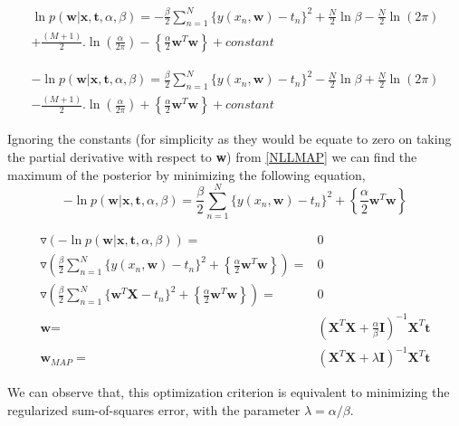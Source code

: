 \documentclass[12pt,twoside,a4paper]{article}
\begin{document}
\begin{multline}
        \ln p(\textbf{w}|\textbf{x},\textbf{t},\alpha,\beta) = -\frac{\beta}{2}\sum_{n=1}^{N} {\{y(x_n,\textbf{w})-t_n\}^2} + \frac{N}{2}\ln\beta - \frac{N}{2}\ln(2\pi) \\ + \frac{(M+1)}{2}.\ln\left( \frac{\alpha}{2\pi}\right) - \left\{ \frac{\alpha}{2}\textbf{w}^T\textbf{w}\right\} + constant
\end{multline}

\begin{multline} \label{NLLMAP}
       - \ln p(\textbf{w}|\textbf{x},\textbf{t},\alpha,\beta) = \frac{\beta}{2}\sum_{n=1}^{N} {\{y(x_n,\textbf{w})-t_n\}^2} - \frac{N}{2}\ln\beta + \frac{N}{2}\ln(2\pi) \\ - \frac{(M+1)}{2}.\ln\left( \frac{\alpha}{2\pi}\right) + \left\{ \frac{\alpha}{2}\textbf{w}^T\textbf{w}\right\} + constant
\end{multline}

Ignoring the constants (for simplicity as they would be equate to zero on taking the partial derivative with respect to \textbf{w}) from \eqref{NLLMAP} we can find the maximum of the posterior by minimizing the following equation,
\begin{equation}
     - \ln p(\textbf{w}|\textbf{x},\textbf{t},\alpha,\beta) = \frac{\beta}{2}\sum_{n=1}^{N} {\{y(x_n,\textbf{w})-t_n\}^2} + \left\{ \frac{\alpha}{2}\textbf{w}^T\textbf{w}\right\} 
\end{equation}

\begin{align}
    \triangledown \left(- \ln p(\textbf{w}|\textbf{x},\textbf{t},\alpha,\beta) \right ) =& 0 \\
    \triangledown \left( \frac{\beta}{2}\sum_{n=1}^{N} {\{y(x_n,\textbf{w})-t_n\}^2} + \left\{ \frac{\alpha}{2}\textbf{w}^T\textbf{w}\right\}  \right ) =& 0 \\
    \triangledown \left( \frac{\beta}{2}\sum_{n=1}^{N} {\{ \textbf{w}^T\textbf{X}-t_n\}^2} + \left\{ \frac{\alpha}{2}\textbf{w}^T\textbf{w}\right\}  \right ) =& 0 \\
 \textbf{w} =& \left(\textbf{X}^T\textbf{X} + \frac{\alpha}{\beta}\textbf{I}\right)^{-1}\textbf{X}^T\textbf{t} \\
 \textbf{w}_{MAP} =& \left(\textbf{X}^T\textbf{X} + \lambda\textbf{I}\right)^{-1}\textbf{X}^T\textbf{t}
\end{align}

We can observe that, this optimization criterion is equivalent to minimizing the regularized sum-of-squares error, with the parameter $\lambda = \alpha/\beta$.
\end{document}
